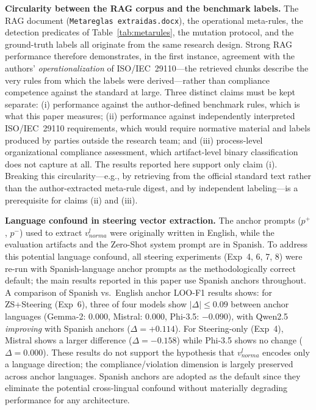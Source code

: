 \documentclass{ieeeaccess}
\begin{document}
\textbf{Circularity between the RAG corpus and the benchmark labels.} The RAG document (\texttt{Metareglas extraidas.docx}), the operational meta-rules, the detection predicates of Table~\ref{tab:metarules}, the mutation protocol, and the ground-truth labels all originate from the same research design. Strong RAG performance therefore demonstrates, in the first instance, agreement with the authors' \emph{operationalization} of ISO/IEC~29110---the retrieved chunks describe the very rules from which the labels were derived---rather than compliance competence against the standard at large. Three distinct claims must be kept separate: (i) performance against the author-defined benchmark rules, which is what this paper measures; (ii) performance against independently interpreted ISO/IEC~29110 requirements, which would require normative material and labels produced by parties outside the research team; and (iii) process-level organizational compliance assessment, which artifact-level binary classification does not capture at all. The results reported here support only claim (i). Breaking this circularity---e.g., by retrieving from the official standard text rather than the author-extracted meta-rule digest, and by independent labeling---is a prerequisite for claims (ii) and (iii).

\textbf{Language confound in steering vector extraction.} The anchor prompts ($p^+$, $p^-$) used to extract $v_{norma}^l$ were originally written in English, while the evaluation artifacts and the Zero-Shot system prompt are in Spanish. To address this potential language confound, all steering experiments (Exp~4, 6, 7, 8) were re-run with Spanish-language anchor prompts as the methodologically correct default; the main results reported in this paper use Spanish anchors throughout. A comparison of Spanish vs.\ English anchor LOO-F1 results shows: for ZS+Steering (Exp~6), three of four models show $|\Delta| \leq 0.09$ between anchor languages (Gemma-2: 0.000, Mistral: 0.000, Phi-3.5: $-0.090$), with Qwen2.5 \emph{improving} with Spanish anchors ($\Delta = +0.114$). For Steering-only (Exp~4), Mistral shows a larger difference ($\Delta = -0.158$) while Phi-3.5 shows no change ($\Delta = 0.000$). These results do not support the hypothesis that $v_{norma}^l$ encodes only a language direction; the compliance/violation dimension is largely preserved across anchor languages. Spanish anchors are adopted as the default since they eliminate the potential cross-lingual confound without materially degrading performance for any architecture.
\end{document}
